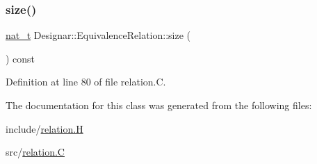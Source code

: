 \subsubsection{\texorpdfstring{size()}{size()}}
{\footnotesize\ttfamily \hyperlink{namespace_designar_aa72662848b9f4815e7bf31a7cf3e33d1}{nat\+\_\+t} Designar\+::\+Equivalence\+Relation\+::size (\begin{DoxyParamCaption}{ }\end{DoxyParamCaption}) const}



Definition at line 80 of file relation.\+C.



The documentation for this class was generated from the following files\+:\begin{DoxyCompactItemize}
\item 
include/\hyperlink{relation_8_h}{relation.\+H}\item 
src/\hyperlink{relation_8_c}{relation.\+C}\end{DoxyCompactItemize}
